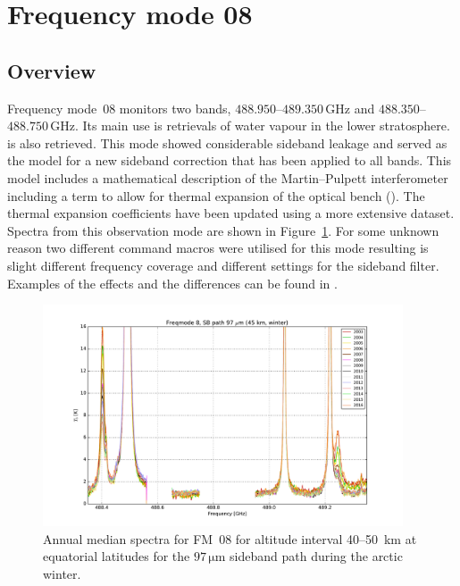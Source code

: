 \section{Frequency mode 08}
\label{sec:fm08}

\subsection{Overview}
\label{sec:fm08:overview}
Frequency mode~08 monitors two bands, $488.950$--$489.350\,\mathrm{GHz}$ and
$488.350$--$488.750\,\mathrm{GHz}$. Its main use is retrievals of water vapour
in the lower stratosphere.  is also retrieved. This mode showed
considerable sideband leakage and served as the model for a new sideband
correction that has been applied to all bands. This model includes a
mathematical description of the Martin--Pulpett interferometer including a
term to allow for thermal expansion of the optical bench
(\cite{postlaunch:2006}). The thermal expansion coefficients have been
updated using a more extensive dataset. Spectra from this observation mode
are shown in Figure~\ref{fig:spectra:08}. For some unknown reason two
different command macros were utilised for this mode resulting is slight
different frequency coverage and different settings for the sideband filter.
Examples of the effects and the differences can be found in
\cite{postlaunch:2006}.

\begin{figure}[ht]
    \centering
    \includegraphics[width=0.95\textwidth]{../DDS/figures/spectra/fm_08_spectra_winter_97u}
    \caption{Annual median spectra for FM~08 for altitude interval 40--50~km at
        equatorial latitudes for the $97\,\mathrm{\mu m}$ sideband path during
        the arctic winter.
    }\label{fig:spectra:08}
\end{figure}


